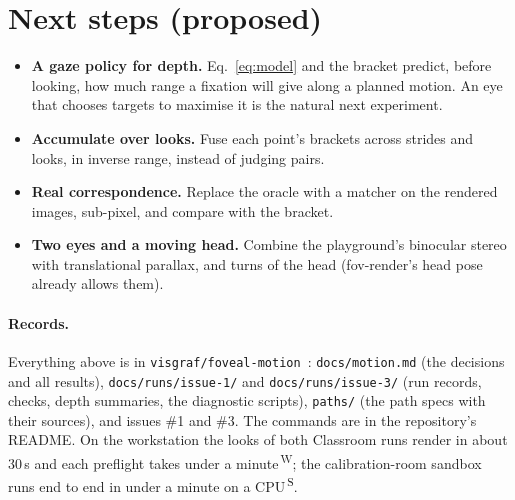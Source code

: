 \documentclass[11pt,a4paper]{article}
\newcommand{\code}[1]{\texttt{\small #1}}
\newcommand{\src}[1]{\textsuperscript{\,#1}}
\newcommand{\WS}{\src{W}}   %
\newcommand{\SB}{\src{S}}   %
\begin{document}
\section{Next steps (proposed)}\label{sec:next}

\begin{itemize}
\item \textbf{A gaze policy for depth.} Eq.~\eqref{eq:model} and the bracket predict, before looking, how much range a
  fixation will give along a planned motion. An eye that chooses targets to maximise it is the natural next experiment.
\item \textbf{Accumulate over looks.} Fuse each point's brackets across strides and looks, in inverse range, instead of
  judging pairs.
\item \textbf{Real correspondence.} Replace the oracle with a matcher on the rendered images, sub-pixel, and compare with
  the bracket.
\item \textbf{Two eyes and a moving head.} Combine the playground's binocular stereo with translational parallax, and
  turns of the head (fov-render's head pose already allows them).
\end{itemize}

\paragraph{Records.} Everything above is in \code{visgraf/foveal-motion}~\cite{fm}: \code{docs/motion.md} (the
decisions and all results), \code{docs/runs/issue-1/} and \code{docs/runs/issue-3/} (run records, checks, depth
summaries, the diagnostic scripts), \code{paths/} (the path specs with their sources), and issues \#1 and \#3. The
commands are in the repository's README. On the workstation the looks of both Classroom runs render in about 30\,s and
each preflight takes under a minute\WS; the calibration-room sandbox runs end to end in under a minute on a CPU\SB.
\end{document}
